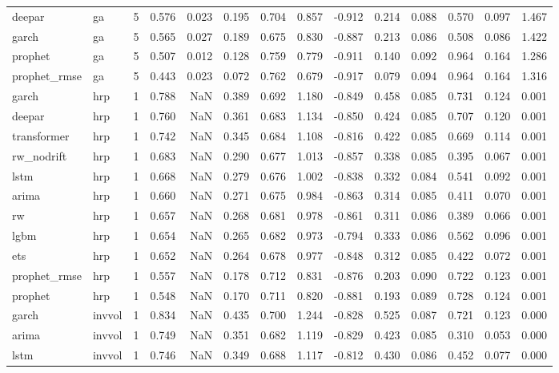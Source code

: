 \begin{table}
\begin{tabular}{llrrrrrrrrrrrr}
deepar & ga & 5 & 0.576 & 0.023 & 0.195 & 0.704 & 0.857 & -0.912 & 0.214 & 0.088 & 0.570 & 0.097 & 1.467 \\
garch & ga & 5 & 0.565 & 0.027 & 0.189 & 0.675 & 0.830 & -0.887 & 0.213 & 0.086 & 0.508 & 0.086 & 1.422 \\
prophet & ga & 5 & 0.507 & 0.012 & 0.128 & 0.759 & 0.779 & -0.911 & 0.140 & 0.092 & 0.964 & 0.164 & 1.286 \\
prophet\_rmse & ga & 5 & 0.443 & 0.023 & 0.072 & 0.762 & 0.679 & -0.917 & 0.079 & 0.094 & 0.964 & 0.164 & 1.316 \\
garch & hrp & 1 & 0.788 & NaN & 0.389 & 0.692 & 1.180 & -0.849 & 0.458 & 0.085 & 0.731 & 0.124 & 0.001 \\
deepar & hrp & 1 & 0.760 & NaN & 0.361 & 0.683 & 1.134 & -0.850 & 0.424 & 0.085 & 0.707 & 0.120 & 0.001 \\
transformer & hrp & 1 & 0.742 & NaN & 0.345 & 0.684 & 1.108 & -0.816 & 0.422 & 0.085 & 0.669 & 0.114 & 0.001 \\
rw\_nodrift & hrp & 1 & 0.683 & NaN & 0.290 & 0.677 & 1.013 & -0.857 & 0.338 & 0.085 & 0.395 & 0.067 & 0.001 \\
lstm & hrp & 1 & 0.668 & NaN & 0.279 & 0.676 & 1.002 & -0.838 & 0.332 & 0.084 & 0.541 & 0.092 & 0.001 \\
arima & hrp & 1 & 0.660 & NaN & 0.271 & 0.675 & 0.984 & -0.863 & 0.314 & 0.085 & 0.411 & 0.070 & 0.001 \\
rw & hrp & 1 & 0.657 & NaN & 0.268 & 0.681 & 0.978 & -0.861 & 0.311 & 0.086 & 0.389 & 0.066 & 0.001 \\
lgbm & hrp & 1 & 0.654 & NaN & 0.265 & 0.682 & 0.973 & -0.794 & 0.333 & 0.086 & 0.562 & 0.096 & 0.001 \\
ets & hrp & 1 & 0.652 & NaN & 0.264 & 0.678 & 0.977 & -0.848 & 0.312 & 0.085 & 0.422 & 0.072 & 0.001 \\
prophet\_rmse & hrp & 1 & 0.557 & NaN & 0.178 & 0.712 & 0.831 & -0.876 & 0.203 & 0.090 & 0.722 & 0.123 & 0.001 \\
prophet & hrp & 1 & 0.548 & NaN & 0.170 & 0.711 & 0.820 & -0.881 & 0.193 & 0.089 & 0.728 & 0.124 & 0.001 \\
garch & invvol & 1 & 0.834 & NaN & 0.435 & 0.700 & 1.244 & -0.828 & 0.525 & 0.087 & 0.721 & 0.123 & 0.000 \\
arima & invvol & 1 & 0.749 & NaN & 0.351 & 0.682 & 1.119 & -0.829 & 0.423 & 0.085 & 0.310 & 0.053 & 0.000 \\
lstm & invvol & 1 & 0.746 & NaN & 0.349 & 0.688 & 1.117 & -0.812 & 0.430 & 0.086 & 0.452 & 0.077 & 0.000 \\

\end{tabular}
\end{table}

